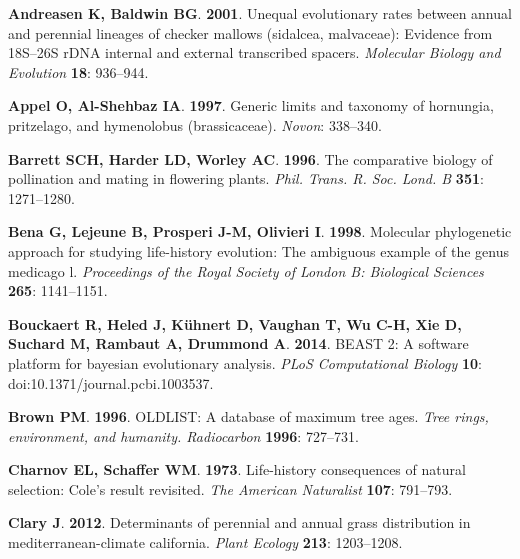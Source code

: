\documentclass[man,floatsintext]{apa6}
\theoremstyle{definition}
\theoremstyle{definition}
\theoremstyle{definition}
\theoremstyle{remark}
\begin{document}
\leavevmode\hypertarget{ref-andreasen2001unequal}{}%
\textbf{\textnormal{Andreasen K}, \textnormal{Baldwin BG}}.
\textbf{2001}. Unequal evolutionary rates between annual and perennial
lineages of checker mallows (sidalcea, malvaceae): Evidence from
18S--26S rDNA internal and external transcribed spacers. \emph{Molecular
Biology and Evolution} \textbf{18}: 936--944.

\leavevmode\hypertarget{ref-appel1997generic}{}%
\textbf{\textnormal{Appel O}, \textnormal{Al-Shehbaz IA}}.
\textbf{1997}. Generic limits and taxonomy of hornungia, pritzelago, and
hymenolobus (brassicaceae). \emph{Novon}: 338--340.

\leavevmode\hypertarget{ref-barrett1996comparative}{}%
\textbf{\textnormal{Barrett SCH}, \textnormal{Harder LD},
\textnormal{Worley AC}}. \textbf{1996}. The comparative biology of
pollination and mating in flowering plants. \emph{Phil. Trans. R. Soc.
Lond. B} \textbf{351}: 1271--1280.

\leavevmode\hypertarget{ref-bena1998molecular}{}%
\textbf{\textnormal{Bena G}, \textnormal{Lejeune B},
\textnormal{Prosperi J-M}, \textnormal{Olivieri I}}. \textbf{1998}.
Molecular phylogenetic approach for studying life-history evolution: The
ambiguous example of the genus medicago l. \emph{Proceedings of the
Royal Society of London B: Biological Sciences} \textbf{265}:
1141--1151.

\leavevmode\hypertarget{ref-bouckaert2014beast}{}%
\textbf{\textnormal{Bouckaert R}, \textnormal{Heled J},
\textnormal{Kühnert D}, \textnormal{Vaughan T}, \textnormal{Wu C-H},
\textnormal{Xie D}, \textnormal{Suchard M}, \textnormal{Rambaut A},
\textnormal{Drummond A}}. \textbf{2014}. BEAST 2: A software platform
for bayesian evolutionary analysis. \emph{PLoS Computational Biology}
\textbf{10}: doi:10.1371/journal.pcbi.1003537.

\leavevmode\hypertarget{ref-brown1996oldlist}{}%
\textbf{\textnormal{Brown PM}}. \textbf{1996}. OLDLIST: A database of
maximum tree ages. \emph{Tree rings, environment, and humanity.
Radiocarbon} \textbf{1996}: 727--731.

\leavevmode\hypertarget{ref-charnov1973life}{}%
\textbf{\textnormal{Charnov EL}, \textnormal{Schaffer WM}}.
\textbf{1973}. Life-history consequences of natural selection: Cole's
result revisited. \emph{The American Naturalist} \textbf{107}: 791--793.

\leavevmode\hypertarget{ref-clary2012determinants}{}%
\textbf{\textnormal{Clary J}}. \textbf{2012}. Determinants of perennial
and annual grass distribution in mediterranean-climate california.
\emph{Plant Ecology} \textbf{213}: 1203--1208.
\end{document}
